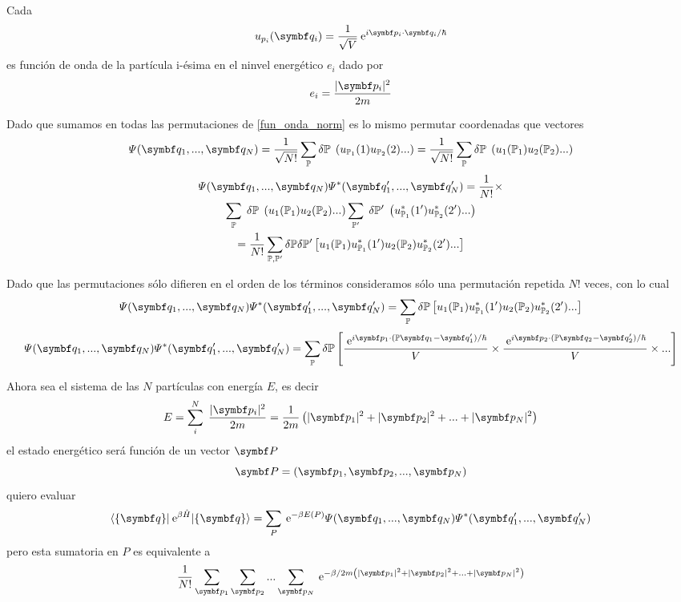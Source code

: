 \documentclass[10pt,oneside]{CBFT_book}
\begin{document}
Cada
\[
	u_{p_i}(\vb{q}_i) = \frac{1}{\sqrt{V}} \euler^{ i \vb{p}_i \cdot \vb{q}_i / \hbar }
\]
es función de onda de la partícula i-ésima en el ninvel energético $e_i$ dado por 
\[
	e_i = \frac{|\vb{p}_i|^2}{2m}
\]

Dado que sumamos en todas las permutaciones de \eqref{fun_onda_norm} es lo mismo permutar coordenadas que vectores
\[
	\Psi (\vb{q}_1,..., \vb{q}_N ) = \frac{1}{\sqrt{N!}} \sum_{ \mathbb{P} } \delta \mathbb{P} \;
	\left( u_{\mathbb{P}_1}(1) u_{\mathbb{P}_2}(2) ... \right) = 
	\frac{1}{\sqrt{N!}} \sum_{ \mathbb{P} } \delta \mathbb{P} \;
	\left( u_1({\mathbb{P}_1}) u_2({\mathbb{P}_2}) ... \right)
\]
\begin{multline*}
	\Psi (\vb{q}_1,..., \vb{q}_N ) \Psi^* (\vb{q}_1',..., \vb{q}_N' ) = \frac{1}{N!} \times \\
	\sum_{\mathbb{P}} \;  \delta \mathbb{P} \; \left(  u_1({\mathbb{P}_1}) u_2({\mathbb{P}_2}) ...\right)
	\sum_{\mathbb{P}'} \;  \delta \mathbb{P}' \; \left(  u_{\mathbb{P}_1}^*(1') u_{\mathbb{P}_2}^*(2') ... \right)\\
	= \frac{1}{N!} \sum_{\mathbb{P},\mathbb{P}'}\delta \mathbb{P} \delta \mathbb{P}'
	\left[ u_1({\mathbb{P}_1}) u_{\mathbb{P}_1}^*(1') u_2({\mathbb{P}_2}) u_{\mathbb{P}_2}^*(2') ... \right]
\end{multline*}

Dado que las permutaciones sólo difieren en el orden de los términos consideramos sólo una permutación repetida $N!$ 
veces, con lo cual 
\[
	\Psi (\vb{q}_1,..., \vb{q}_N ) \Psi^* (\vb{q}_1',..., \vb{q}_N' ) =
	\sum_{\mathbb{P}} \delta \mathbb{P} 
	\left[ u_1({\mathbb{P}_1}) u_{\mathbb{P}_1}^*(1') u_2({\mathbb{P}_2}) u_{\mathbb{P}_2}^*(2') ... \right]
\]
\[
	\Psi (\vb{q}_1,..., \vb{q}_N ) \Psi^* (\vb{q}_1',..., \vb{q}_N' ) =
	\sum_{\mathbb{P}} \delta \mathbb{P}
	\left[ \frac{\euler^{ i \vb{p}_1 \cdot ( \mathbb{P}\vb{q}_1 - \vb{q}_1' )/\hbar} }{V} \times 
	\frac{\euler^{ i \vb{p}_2 \cdot ( \mathbb{P}\vb{q}_2 - \vb{q}_2' )/\hbar}}{V} \times ... \right]
\]
\notamargen{
\[
	\delta \mathbb{P} = \begin{cases}
	                     1 \qquad \text{ bosones } \\
	                     \pm 1 \qquad \text{ fermiones}\\
	                     \text{ (perm par o impar) }
	                    \end{cases}
\]}

Ahora sea el sistema de las $N$ partículas con energía $E$, es decir 
\[
	E = \sum_i^N \; \frac{|\vb{p}_i|^2}{2m} =
	\frac{1}{2m} \left( |\vb{p}_1|^2 + |\vb{p}_2|^2 + ... + |\vb{p}_N|^2 \right)
\]
el estado energético será función de un vector $\vb{P}$
\[
	\vb{P} = (\vb{p}_1, \vb{p}_2, ..., \vb{p}_N )
\]
quiero evaluar 
\[
	\braket{ \{ \vb{q} \} | \euler^{\beta \hat{H}} | \{ \vb{q} \} } =
	\sum_P \euler^{-\beta E(P)} \Psi (\vb{q}_1,..., \vb{q}_N ) \Psi^* (\vb{q}_1',..., \vb{q}_N' )
\]
pero esta sumatoria en $P$ es equivalente a 
\[
	\frac{1}{N!} \sum_{\vb{p}_1} \sum_{\vb{p}_2} ... \sum_{\vb{p}_N} 
	\euler^{-\beta/2m \left( |\vb{p}_1|^2 + |\vb{p}_2|^2 + ... + |\vb{p}_N|^2 \right)}
\]
\end{document}
